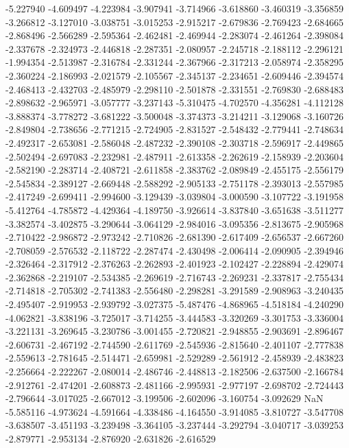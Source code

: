 -5.227940
-4.609497
-4.223984
-3.907941
-3.714966
-3.618860
-3.460319
-3.356859
-3.266812
-3.127010
-3.038751
-3.015253
-2.915217
-2.679836
-2.769423
-2.684665
-2.868496
-2.566289
-2.595364
-2.462481
-2.469944
-2.283074
-2.461264
-2.398084
-2.337678
-2.324973
-2.446818
-2.287351
-2.080957
-2.245718
-2.188112
-2.296121
-1.994354
-2.513987
-2.316784
-2.331244
-2.367966
-2.317213
-2.058974
-2.358295
-2.360224
-2.186993
-2.021579
-2.105567
-2.345137
-2.234651
-2.609446
-2.394574
-2.468413
-2.432703
-2.485979
-2.298110
-2.501878
-2.331551
-2.769830
-2.688483
-2.898632
-2.965971
-3.057777
-3.237143
-5.310475
-4.702570
-4.356281
-4.112128
-3.888374
-3.778272
-3.681222
-3.500048
-3.374373
-3.214211
-3.129068
-3.160726
-2.849804
-2.738656
-2.771215
-2.724905
-2.831527
-2.548432
-2.779441
-2.748634
-2.492317
-2.653081
-2.586048
-2.487232
-2.390108
-2.303718
-2.596917
-2.449865
-2.502494
-2.697083
-2.232981
-2.487911
-2.613358
-2.262619
-2.158939
-2.203604
-2.582190
-2.283714
-2.408721
-2.611858
-2.383762
-2.089849
-2.455175
-2.556179
-2.545834
-2.389127
-2.669448
-2.588292
-2.905133
-2.751178
-2.393013
-2.557985
-2.417249
-2.699411
-2.994600
-3.129439
-3.039804
-3.000590
-3.107722
-3.191958
-5.412764
-4.785872
-4.429364
-4.189750
-3.926614
-3.837840
-3.651638
-3.511277
-3.382574
-3.402875
-3.290644
-3.064129
-2.984016
-3.095356
-2.813675
-2.905968
-2.710422
-2.986872
-2.973242
-2.710826
-2.681390
-2.617409
-2.656537
-2.667260
-2.708059
-2.576532
-2.118722
-2.287474
-2.430498
-2.006414
-2.090905
-2.394946
-2.326464
-2.317912
-2.376263
-2.262893
-2.401923
-2.102427
-2.228894
-2.429074
-2.362868
-2.219107
-2.534385
-2.269619
-2.716743
-2.269231
-2.337817
-2.755434
-2.714818
-2.705302
-2.741383
-2.556480
-2.298281
-3.291589
-2.908963
-3.240435
-2.495407
-2.919953
-2.939792
-3.027375
-5.487476
-4.868965
-4.518184
-4.240290
-4.062821
-3.838196
-3.725017
-3.714255
-3.444583
-3.320269
-3.301753
-3.336004
-3.221131
-3.269645
-3.230786
-3.001455
-2.720821
-2.948855
-2.903691
-2.896467
-2.606731
-2.467192
-2.744590
-2.611769
-2.545936
-2.815640
-2.401107
-2.777838
-2.559613
-2.781645
-2.514471
-2.659981
-2.529289
-2.561912
-2.458939
-2.483823
-2.256664
-2.222267
-2.080014
-2.486746
-2.448813
-2.182506
-2.637500
-2.166784
-2.912761
-2.474201
-2.608873
-2.481166
-2.995931
-2.977197
-2.698702
-2.724443
-2.796644
-3.017025
-2.667012
-3.199506
-2.602096
-3.160754
-3.092629
NaN
-5.585116
-4.973624
-4.591664
-4.338486
-4.164550
-3.914085
-3.810727
-3.547708
-3.638507
-3.451193
-3.239498
-3.364105
-3.237444
-3.292794
-3.040717
-3.039253
-2.879771
-2.953134
-2.876920
-2.631826
-2.616529
